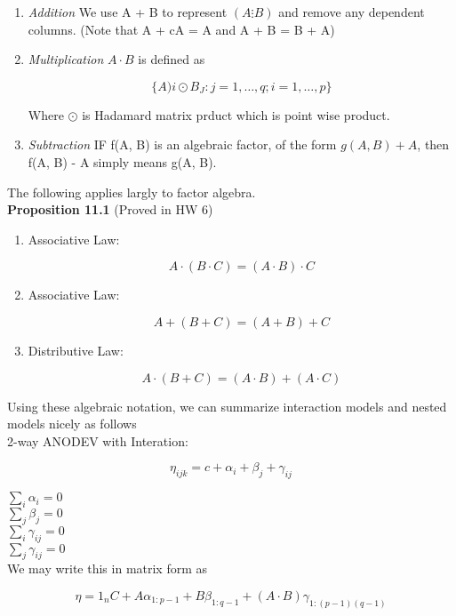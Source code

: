 \documentclass[11pt,fleqn]{book} %
\begin{document}
	\begin{enumerate}
		\item \textit{Addition} We use A + B to represent $(A \vdots B)$ and remove any dependent columns. (Note that A + cA = A and A + B = B + A)
		\item \textit{Multiplication} $A \cdot B$ is defined as 

				$$\{A)i \odot B_J: j = 1, \dots, q; i = 1, \dots, p \} $$

		Where $\odot$ is Hadamard matrix prduct which is point wise product. 
		
		\item \textit{Subtraction} IF f(A, B) is an algebraic factor, of the form $g(A, B) + A$, then f(A, B) - A simply means g(A, B).	
	\end{enumerate}


The following applies largly to factor algebra. \\


\textbf{Proposition 11.1}  (Proved in HW 6)\\
\begin{enumerate}
	\item Associative Law: 
			
			$$A \cdot (B \cdot C) = (A \cdot B) \cdot C$$

	\item Associative Law: 

			$$ A + (B + C) = (A + B) + C$$

	\item Distributive Law:

			$$A \cdot (B + C) = (A \cdot B) + (A \cdot C) $$
\end{enumerate}

Using these algebraic notation, we can summarize interaction models and nested models nicely as follows \\

2-way ANODEV with Interation:

		$$\eta_{ijk} = c + \alpha_i + \beta_j + \gamma_{ij} $$

$\sum_i \alpha_i = 0$\\
$\sum_j \beta_j = 0$\\
$\sum_i \gamma_{ij} = 0$\\
$\sum_j \gamma_{ij} = 0$\\


We may write this in matrix form as 

		$$ \eta = 1_n C + A\alpha_{1:p-1} + B\beta_{1: q-1} + (A \cdot B) \gamma_{1:(p-1)(q-1)}$$
\end{document}
